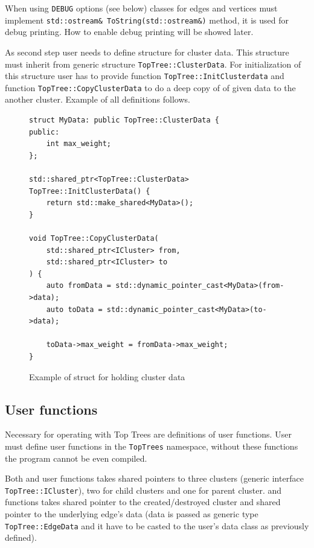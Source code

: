 When using \texttt{DEBUG} options (see below) classes for edges and vertices
must implement \texttt{std::ostream\& ToString(std::ostream\&)} method, it is
used for debug printing. How to enable debug printing will be showed later.

As second step user needs to define structure for cluster data. This structure
must inherit from generic structure \texttt{TopTree::ClusterData}. For
initialization of this structure user has to provide function
\texttt{TopTree::InitClusterdata} and function \texttt{TopTree::CopyClusterData}
to do a deep copy of of given data to the another cluster. Example of all
definitions follows.

\begin{figure}[H]
\begin{verbatim}
struct MyData: public TopTree::ClusterData {
public:
    int max_weight;
};

std::shared_ptr<TopTree::ClusterData> TopTree::InitClusterData() {
    return std::make_shared<MyData>();
}

void TopTree::CopyClusterData(
    std::shared_ptr<ICluster> from,
    std::shared_ptr<ICluster> to
) {
    auto fromData = std::dynamic_pointer_cast<MyData>(from->data);
    auto toData = std::dynamic_pointer_cast<MyData>(to->data);

    toData->max_weight = fromData->max_weight;
}

\end{verbatim}
\caption{Example of struct for holding cluster data}
\end{figure}

\subsection{User functions}

Necessary for operating with Top Trees are definitions of user functions. User
must define user functions in the \texttt{TopTrees} namespace, without these
functions the program cannot be even compiled.

Both \Join{} and \Split{} user functions takes shared pointers to three clusters
(generic interface \texttt{TopTree::ICluster}), two for child clusters and one
for parent cluster.
\Create{} and \Destroy{} functions takes shared pointer to the created/destroyed
cluster and shared pointer to the underlying edge's data (data is passed as
generic type \texttt{TopTree::EdgeData} and it have to be casted to the user's
data class as previously defined).

